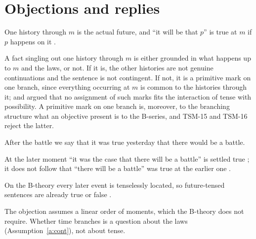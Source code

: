 \documentclass{situationist-preprint}
\begin{document}
\section{Objections and replies}

\begin{objection}\label{o:trl}
One history through $m$ is the actual future, and \enquote{it will be that $p$} is true at $m$ if $p$ happens on it \citep{MalpassWawer2012}.
\end{objection}

\begin{reply}
A fact singling out one history through $m$ is either grounded in what happens up to $m$ and the laws, or not. If it is, the other histories are not genuine continuations and the sentence is not contingent. If not, it is a primitive mark on one branch, since everything occurring at $m$ is common to the histories through it; and \citet{BelnapGreen1994} argued that no assignment of such marks fits the interaction of tense with possibility. A primitive mark on one branch is, moreover, to the branching structure what an objective present is to the B-series, and TSM-15 and TSM-16 reject the latter.
\end{reply}

\begin{objection}\label{o:retro}
After the battle we say that it was true yesterday that there would be a battle.
\end{objection}

\begin{reply}
At the later moment \enquote{it was the case that there will be a battle} is settled true \citep{Thomason1970}; it does not follow that \enquote{there will be a battle} was true at the earlier one \citep[compare][]{MacFarlane2003}.
\end{reply}

\begin{objection}\label{o:det}
On the B-theory every later event is tenselessly located, so future-tensed sentences are already true or false \citep{Williams1951,Sider2001}.
\end{objection}

\begin{reply}
The objection assumes a linear order of moments, which the B-theory does not require. Whether time branches is a question about the laws (Assumption~\ref{a:cont}), not about tense.
\end{reply}
\end{document}
